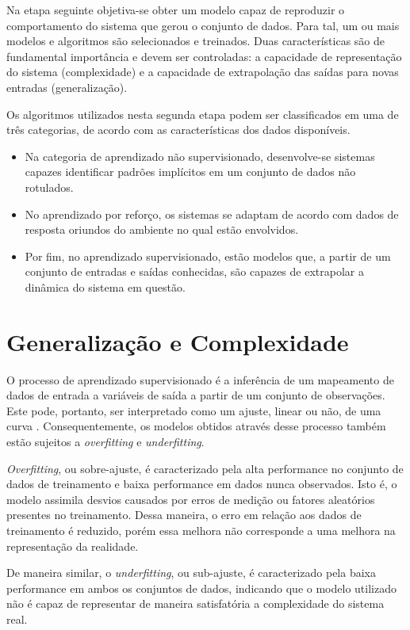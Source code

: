 Na etapa seguinte objetiva-se obter um modelo capaz de reproduzir o comportamento do sistema que gerou o conjunto de dados. Para tal, um ou mais modelos e algoritmos são selecionados e treinados. Duas características são de fundamental importância e devem ser controladas: a capacidade de representação do sistema (complexidade) e a capacidade de extrapolação das saídas para novas entradas (generalização).

Os algoritmos utilizados nesta segunda etapa podem ser classificados em uma de três categorias, de acordo com as características dos dados disponíveis. \cite{ai_modern}
\begin{itemize}
    \item Na categoria de aprendizado não supervisionado, desenvolve-se sistemas capazes identificar padrões implícitos em um conjunto de dados não rotulados.
    \item No aprendizado por reforço, os sistemas se adaptam de acordo com dados de resposta oriundos do ambiente no qual estão envolvidos.
    \item Por fim, no aprendizado supervisionado, estão modelos que, a partir de um conjunto de entradas e saídas conhecidas, são capazes de extrapolar a dinâmica do sistema em questão.
\end{itemize}

\section{Generalização e Complexidade}

O processo de aprendizado supervisionado é a inferência de um mapeamento de dados de entrada a variáveis de saída a partir de um conjunto de observações. Este pode, portanto, ser interpretado como um ajuste, linear ou não, de uma curva \cite{haykin}. Consequentemente, os modelos obtidos através desse processo também estão sujeitos a \textit{overfitting} e \textit{underfitting}.

\textit{Overfitting}, ou sobre-ajuste, é caracterizado pela alta performance no conjunto de dados de treinamento e baixa performance em dados nunca observados. Isto é, o modelo assimila desvios causados por erros de medição ou fatores aleatórios presentes no treinamento. Dessa maneira, o erro em relação aos dados de treinamento é reduzido, porém essa melhora não corresponde a uma melhora na representação da realidade.

De maneira similar, o \textit{underfitting}, ou sub-ajuste, é caracterizado pela baixa performance em ambos os conjuntos de dados, indicando que o modelo utilizado não é capaz de representar de maneira satisfatória a complexidade do sistema real.

